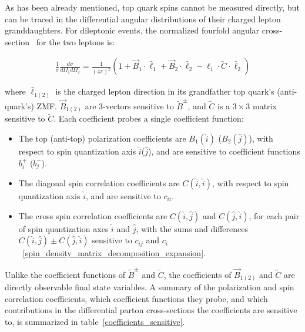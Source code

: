 As has been already mentioned, top quark spins cannot be measured directly, but can be traced in the differential angular distributions of their charged lepton granddaughters.
For \ttbar dileptonic events, the normalized fourfold angular cross-section~\cite{Bernreuther} for the two leptons is:
\begin{linenomath*}
\begin{align}
\frac{1}{\sigma} \frac{d \sigma}{d \Omega_1 d \Omega_2}=\frac{1}{(4 \pi)^2}\left(1+\vec{B}_1 \cdot \hat{\ell}_1+\vec{B}_2 \cdot \hat{\ell}_2-\hat{\ell}_1 \cdot \overleftrightarrow{C} \cdot \hat{\ell}_2\right)
\label{fourfold_angular_distribution}
\end{align}
\end{linenomath*}
where $\hat{\ell}_{1(2)}$ is the charged lepton direction in its grandfather top quark's (anti-quark's) ZMF.
$\vec{B}_{1(2)}$ are 3-vectors sensitive to $\tilde{B}^\pm$, and $\overleftrightarrow{C}$ is a $3\times3$ matrix sensitive to $\tilde{C}$.
Each coefficient probes a single coefficient function:
\begin{itemize}
\item The top (anti-top) polarization coefficients are $B_{1}(\hat{i})$ ($B_{2}(\hat{j})$), with respect to spin quantization axis $\hat{i}$($\hat{j}$), and are sensitive to coefficient functions $b^+_i$ ($b^-_j$).
\item The diagonal spin correlation coefficients are $C(\hat{i},\hat{i})$, with respect to spin quantization axis $\hat{i}$, and are sensitive to $c_{ii}$.
\item The cross spin correlation coefficients are $C(\hat{i},\hat{j})$ and $C(\hat{j},\hat{i})$,  for each pair of spin quantization axes $\hat{i}$ and $\hat{j}$, with the sums and differences $C(\hat{i},\hat{j}) \pm C(\hat{j},\hat{i})$ sensitive to $c_{ij}$ and $c_{i}$~\ref{spin_density_matrix_decomposition_expansion}.
\end{itemize}
Unlike the coefficient functions of $\tilde{B}^\pm$ and $\tilde{C}$, the coefficients of $\vec{B}_{1(2)}$ and $\overleftrightarrow{C}$ are directly observable final state variables.
A summary of the polarization and spin correlation coefficients, which coefficient functions they probe, and which contributions in the differential parton cross-sections the coefficients are sensitive to, is summarized in table~\ref{coefficients_sensitive}.
